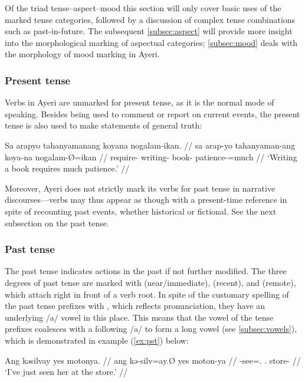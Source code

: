 Of the triad tense--aspect--mood this section will only cover basic uses of 
the marked tense categories, followed by a discussion of complex tense 
combinations such as past-in-future. The subsequent \autoref{subsec:aspect} 
will provide more insight into the morphological marking of aspectual 
categories; \autoref{subsec:mood} deals with the morphology of mood marking in 
Ayeri.

\subsubsection{Present tense}
Verbs in Ayeri are unmarked for present tense, as it is the normal mode of 
speaking. Besides being used to comment or report on current events, the 
present tense is also used to make statements of general truth:

\ex\begingl
	\gla Sa arapyo tahanyamanang koyana nogalam-ikan. //
	\glb sa arap-yo tahanyaman-ang koya-na nogalam-Ø=ikan //
	\glc \PatT{} require-\TsgN{} writing-\Aarg{} book-\Gen{} 
		patience-\Top{}=much //
	\glft `Writing a book requires much patience.' //
\endgl\xe

Moreover, Ayeri does not strictly mark its verbs for past tense in narrative 
discourses---verbs may thus appear as though with a present-time reference in 
spite of recounting past events, whether historical or fictional. See the next 
subsection on the past tense.


\subsubsection{Past tense}
\label{subsubsec:past}
The past tense indicates actions in the past if not further modified. The three
degrees of past tense are marked with  (near/immediate),
 (recent), and  (remote), which attach right in
front of a verb root. In spite of the customary spelling of the past tense
prefixes with , which reflects pronunciation, they have an underlying
/a/ vowel in this place. This means that the vowel of the tense prefixes
coalesces with a following /a/ to form a long vowel (see
\autoref{subsec:vowels}), which is demonstrated in example (\ref{ex:pst})
below:

\pex
\a\label{ex:npst}\begingl
	\gla Ang kəsilvay yes motonya. //
	\glb ang kə-silv=ay.Ø yes moton-ya //
	\glc \AgtT{} \NPst{}-see=\Fsg{}.\Top{} \TsgF{}.\Parg{} store-\Loc{} //
	\glft `I've just seen her at the store.' //
\endgl

